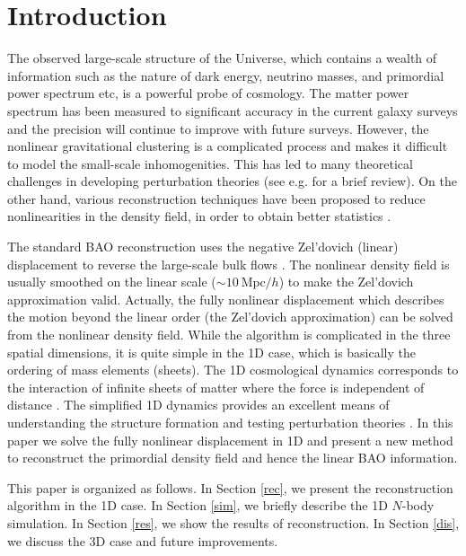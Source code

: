\documentclass[aps,prd,twocolumn,showpacs,superscriptaddress,groupedaddress,nofootinbib]{revtex4}  %
\newcommand{\mr}{\mathrm}
\begin{document}

\section{Introduction}
The observed large-scale structure of the Universe, which contains a wealth of 
information such as the nature of dark energy, neutrino masses, and primordial
power spectrum etc, is a powerful probe of cosmology.
The matter power spectrum has been measured to significant accuracy in the 
current galaxy surveys and the precision will continue to improve with future 
surveys. 
However, the nonlinear gravitational clustering is a complicated process and 
makes it difficult to model the small-scale inhomogenities. This has led to
many theoretical challenges in developing perturbation theories 
(see e.g. \cite{2016matt} for a brief review).
On the other hand, various reconstruction techniques have been proposed to 
reduce nonlinearities in the density field, in order to obtain better statistics
\cite{2007bao,2015PhRvD..92l3522S}. 
 
The standard BAO reconstruction uses the negative
Zel'dovich (linear) displacement to reverse the large-scale bulk flows 
\cite{2007bao}. 
The nonlinear density field is usually smoothed on the linear scale 
($\sim10\ \mr{Mpc}/h$) to make the Zel'dovich approximation valid.
Actually, the fully nonlinear displacement which describes the motion beyond
the linear order (the Zel'dovich approximation) can be solved from the nonlinear
density field. 
While the algorithm is complicated in the three spatial dimensions, it is quite simple in the 1D case, which is basically the ordering of mass elements 
(sheets).
The 1D cosmological dynamics corresponds to the interaction of infinite sheets
of matter where the force is independent of distance \cite{2016matt}.
The simplified 1D dynamics provides an excellent means of understanding the 
structure formation and testing perturbation theories \cite{2016matt}.
In this paper we solve the fully nonlinear displacement in 1D and present
a new method to reconstruct the primordial density field and hence the linear 
BAO information.

This paper is organized as follows. 
In Section \ref{rec}, we present the reconstruction algorithm in the 1D case. 
In Section \ref{sim}, we briefly describe the 1D $N$-body simulation. 
In Section \ref{res}, we show the results of reconstruction.
In Section \ref{dis}, we discuss the 3D case and future improvements.
\end{document}
